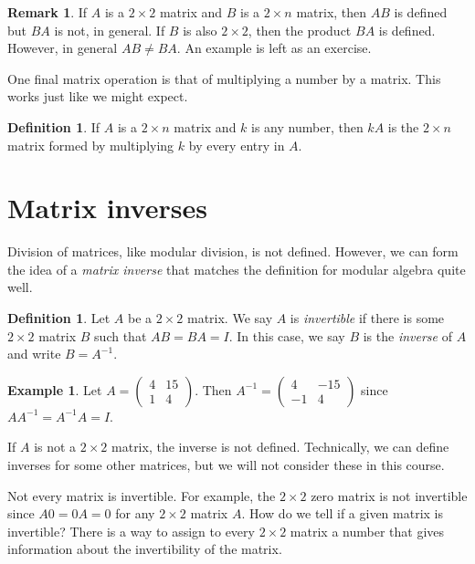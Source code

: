 \documentclass{book}
\theoremstyle{plain}
\theoremstyle{definition}
\newtheorem{definition}[theorem]{Definition}
\newtheorem{example}[theorem]{Example}
\newtheorem{remark}[theorem]{Remark}
\begin{document}
\begin{remark}
If $A$ is a $2 \times 2$ matrix and $B$ is a $2 \times n$ matrix, then $AB$ is defined but $BA$ is not, in general. If $B$ is also $2 \times 2$, then the product $BA$ is defined. However, in general $AB \neq BA$. An example is left as an exercise.
\end{remark}

One final matrix operation is that of multiplying a number by a matrix. This works just like we might expect.

\begin{definition}
If $A$ is a $2 \times n$ matrix and $k$ is any number, then $kA$ is the $2 \times n$ matrix formed by multiplying $k$ by every entry in $A$.
\end{definition}

\section{Matrix inverses}
Division of matrices, like modular division, is not defined. However, we can form the idea of a {\it matrix inverse} that matches the definition for modular algebra quite well.

\begin{definition}
Let $A$ be a $2 \times 2$ matrix. We say $A$ is {\it invertible} if there is some $2 \times 2$ matrix $B$ such that $AB = BA = I$. In this case, we say $B$ is the {\it inverse} of $A$ and write $B = A^{-1}$.
\end{definition}

\begin{example}
Let $A = \begin{pmatrix} 4 & 15 \\ 1 & 4 \end{pmatrix}$. Then $A^{-1} = \begin{pmatrix} 4 & -15 \\ -1 & 4 \end{pmatrix}$ since $AA^{-1} = A^{-1}A = I$.
\end{example}

If $A$ is not a $2 \times 2$ matrix, the inverse is not defined. Technically, we can define inverses for some other matrices, but we will not consider these in this course.

Not every matrix is invertible. For example, the $2 \times 2$ zero matrix is not invertible since $A0 = 0A = 0$ for any $2 \times 2$ matrix $A$. How do we tell if a given matrix is invertible? There is a way to assign to every $2 \times 2$ matrix a number that gives information about the invertibility of the matrix.
\end{document}

